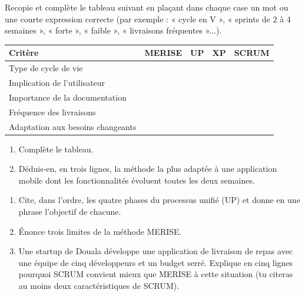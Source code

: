 \documentclass[11pt]{article}
\newcounter{popsec}
\newcounter{popsub}
\newcommand{\courssub}[1]{%
  \stepcounter{popsub}%
  \par\vspace{9pt}\noindent{\popxbold\fontsize{11.5}{13}\selectfont\color{popink}{\color{poporange}\thepopsec.\thepopsub}\hspace{6pt}#1}\par\nopagebreak\vspace{4pt}
}
\begin{document}
\begin{exercice}
Recopie et complète le tableau suivant en plaçant dans chaque case un mot ou une courte expression correcte (par exemple : « cycle en V », « sprints de 2 à 4 semaines », « forte », « faible », « livraisons fréquentes »...).

\begin{center}
\begin{tabularx}{\linewidth}{|l|X|X|X|X|}
\hline
\rowcolor{popblueL} \textbf{Critère} & \textbf{MERISE} & \textbf{UP} & \textbf{XP} & \textbf{SCRUM} \\
\hline
Type de cycle de vie & & & & \\
\hline
Implication de l'utilisateur & & & & \\
\hline
Importance de la documentation & & & & \\
\hline
Fréquence des livraisons & & & & \\
\hline
Adaptation aux besoins changeants & & & & \\
\hline
\end{tabularx}
\end{center}

\begin{enumerate}
    \item Complète le tableau.
    \item Déduis-en, en trois lignes, la méthode la plus adaptée à une application mobile dont les fonctionnalités évoluent toutes les deux semaines.
\end{enumerate}
\end{exercice}

\begin{exercice}
\begin{enumerate}
    \item Cite, dans l'ordre, les quatre phases du processus unifié (UP) et donne en une phrase l'objectif de chacune.
    \item Énonce trois limites de la méthode MERISE.
    \item Une startup de Douala développe une application de livraison de repas avec une équipe de cinq développeurs et un budget serré. Explique en cinq lignes pourquoi SCRUM convient mieux que MERISE à cette situation (tu citeras au moins deux caractéristiques de SCRUM).
\end{enumerate}
\end{exercice}

\courssub{Je me prépare au Bac}
\end{document}
